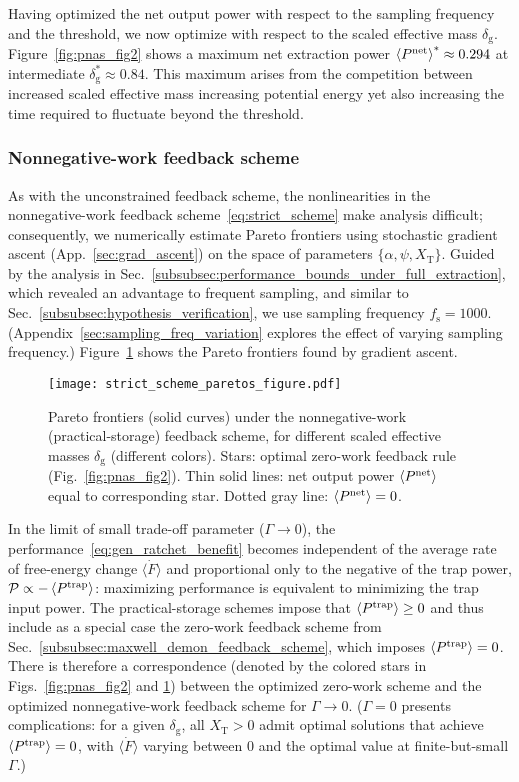 \documentclass[%
reprint,
bibnotes, amsmath, amssymb, aps, pre,
 showkeys,
floatfix
]{revtex4-2}
\newcommand{\mrm}{\mathrm}
\newcommand{\mcal}{\mathcal}
\newcommand{\dg}{\delta_{\mrm{g}}}
\newcommand{\fs}{f_{\mrm{s}}}
\newcommand{\ept}{\ev{P^{\mrm{trap}}}}
\newcommand{\epg}{\langle\dot{F}\rangle}
\newcommand{\epn}{\ev{P^{\mrm{net}}}}
\newcommand{\xT}{X_{\mrm{T}}}
\newcommand{\mP}{\mcal{P}}
\begin{document}
Having optimized the net output power with respect to the sampling frequency and the threshold, we now optimize with respect to the scaled effective mass $\dg$. Figure~\ref{fig:pnas_fig2} shows a maximum net extraction power $\epn^{*} \approx 0.294$ at intermediate $\dg^{*}\approx 0.84$.
This maximum arises from the competition between increased scaled effective mass increasing potential energy yet also increasing the time required to fluctuate beyond the threshold.

\subsubsection{Nonnegative-work feedback scheme} 
\label{subsubsec:strict_feedback_scheme}
As with the unconstrained feedback scheme, the nonlinearities in the nonnegative-work feedback scheme~\eqref{eq:strict_scheme} make analysis difficult; consequently, we numerically estimate Pareto frontiers using stochastic gradient ascent (App.~\ref{sec:grad_ascent}) on the space of parameters $\{\alpha,\psi,\xT\}$.
Guided by the analysis in Sec.~\ref{subsubsec:performance_bounds_under_full_extraction}, which revealed an advantage to frequent sampling, and similar to Sec.~\ref{subsubsec:hypothesis_verification}, we use sampling frequency $\fs = 1000$. (Appendix~\ref{sec:sampling_freq_variation} explores the effect of varying sampling frequency.)
Figure~\ref{fig:strict_max} shows the Pareto frontiers found by gradient ascent.

\begin{figure}[htbp]
    \centering
    \texttt{[image: strict\_scheme\_paretos\_figure.pdf]}
    \caption{
        Pareto frontiers (solid curves) under the nonnegative-work (practical-storage) feedback scheme, for different scaled effective masses $\dg$ (different colors). 
        Stars: optimal zero-work feedback rule (Fig.~\ref{fig:pnas_fig2}). 
        Thin solid lines: net output power $\epn$ equal to corresponding star. 
        Dotted gray line: $\epn=0$. 
        }
    \label{fig:strict_max}
\end{figure}

In the limit of small trade-off parameter ($\Gamma\to 0$), the performance~\eqref{eq:gen_ratchet_benefit} becomes independent of the average rate of free-energy change $\epg$ and proportional only to the negative of the trap power, $\mP\propto -\ept$: maximizing performance is equivalent to minimizing the trap input power.
The practical-storage schemes impose that $\ept \ge 0$ and thus include as a special case the zero-work feedback scheme from Sec.~\ref{subsubsec:maxwell_demon_feedback_scheme}, which imposes $\ept = 0$.
There is therefore a correspondence (denoted by the colored stars in Figs.~\ref{fig:pnas_fig2} and \ref{fig:strict_max}) between the optimized zero-work scheme and the optimized nonnegative-work feedback scheme for $\Gamma\to 0$. 
($\Gamma=0$ presents complications: for a given $\dg$, all $\xT > 0$ admit optimal solutions that achieve $\ept=0$, with $\epg$ varying between 0 and the optimal value at finite-but-small $\Gamma$.) 
\end{document}
